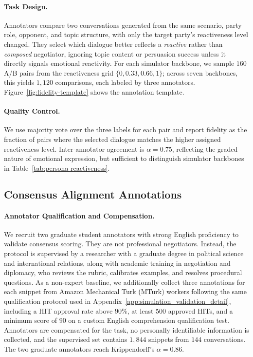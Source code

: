 \paragraph{Task Design.}
Annotators compare two conversations generated from the same scenario, party role, opponent, and topic structure, with only the target party's reactiveness level changed. They select which dialogue better reflects a \emph{reactive} rather than \emph{composed} negotiator, ignoring topic content or persuasion success unless it directly signals emotional reactivity. For each simulator backbone, we sample $160$ A/B pairs from the reactiveness grid $\{0, 0.33, 0.66, 1\}$; across seven backbones, this yields $1{,}120$ comparisons, each labeled by three annotators. Figure~\ref{fig:fidelity-template} shows the annotation template.

\paragraph{Quality Control.}
We use majority vote over the three labels for each pair and report fidelity as the fraction of pairs where the selected dialogue matches the higher assigned reactiveness level. Inter-annotator agreement is $\alpha = 0.75$, reflecting the graded nature of emotional expression, but sufficient to distinguish simulator backbones in Table~\ref{tab:persona-reactiveness}.

\subsection{Consensus Alignment Annotations}
\label{app:evaluation_validation_detail}

\paragraph{Annotator Qualification and Compensation.}
We recruit two graduate student annotators with strong English proficiency to validate consensus scoring. They are not professional negotiators. Instead, the protocol is supervised by a researcher with a graduate degree in political science and international relations, along with academic training in negotiation and diplomacy, who reviews the rubric, calibrates examples, and resolves procedural questions. As a non-expert baseline, we additionally collect three annotations for each snippet from Amazon Mechanical Turk (MTurk) workers following the same qualification protocol used in Appendix~\ref{app:simulation_validation_detail}, including a HIT approval rate above $90\%$, at least $500$ approved HITs, and a minimum score of $90$ on a custom English comprehension qualification test. Annotators are compensated for the task, no personally identifiable information is collected, and the supervised set contains $1{,}844$ snippets from $144$ conversations. The two graduate annotators reach Krippendorff's $\alpha = 0.86$.


